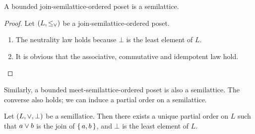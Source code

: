 \documentclass[dvipdfmx,autodetect-engine]{jsarticle}
\begin{document}
\begin{proposition}
A bounded join-semilattice-ordered poset is a semilattice.
\end{proposition}
\begin{proof}
Let $(L,\leq_\vee)$ be a join-semilattice-ordered poset.
\begin{enumerate}
\item The neutrality law holds because $\bot$ is the least element of $L$. 
\item It is obvious that the associative, commutative and idempotent law hold.
\end{enumerate}
\end{proof}
%
Similarly, a bounded meet-semilattice-ordered poset is also a semilattice.
The converse also holds; we can induce a partial order on a semilattice.
%
\begin{theorem} 
\label{basicTheorem}
Let $(L,\vee,\bot)$  be a semillatice. 
Then there exists a unique partial order on $L$
such that $a \vee b$ is the join of $\set{a,b}$, and
$\bot$ is the least element of $L$. 
\end{theorem}
%
\end{document}
